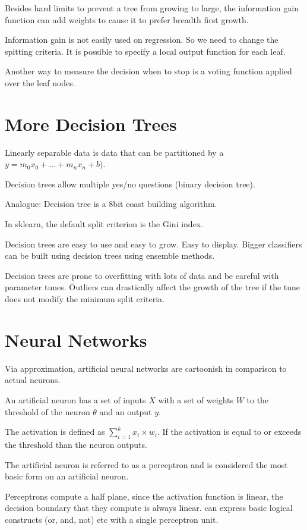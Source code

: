 \documentclass{article}
\begin{document}
Besides hard limits to prevent a tree from growing to large, the information
gain function can add weights to cause it to prefer breadth first growth. 

Information gain is not easily used on regression. So we need to change the 
spitting criteria. It is possible to specify a local output function for each 
leaf. 

Another way to measure the decision when to stop is a voting function applied
over the leaf nodes. 

\section {More Decision Trees}

Linearly separable data is data that can be partitioned by a $y = m_0x_0 +
\ldots + m_nx_n + b)$. 

Decision trees allow multiple yes/no questions (binary decision tree).

Analogue: Decision tree is a 8bit coast building algorithm. 

In sklearn, the default split criterion is the Gini index.

Decision trees are easy to use and easy to grow. Easy to display.
Bigger classifiers can be built using decision trees using ensemble methods. 

Decision trees are prone to overfitting with lots of data and be careful
with parameter tunes. Outliers can drastically affect the growth of the tree
if the tune does not modify the minimum split criteria. 

\section{Neural Networks}
Via approximation, artificial neural networks are cartoonish in comparison to
actual neurons. 

An artificial neuron has a set of inputs $X$ with a set of weights $W$ to the
threshold of the neuron $\theta$ and an output $y$. 

The activation is defined as $\sum_{i = 1}^k x_i \times w_i$. If the activation
is equal to or exceeds the threshold than the neuron outputs. 

The artificial neuron is referred to as a perceptron and is considered the most
basic form on an artificial neuron. 

Perceptrons compute a half plane, since the activation function is linear, the 
decision boundary that they compute is always linear. 
 can express basic logical constructs (or, and, not) etc with a 
single perceptron unit. 
\end{document}
